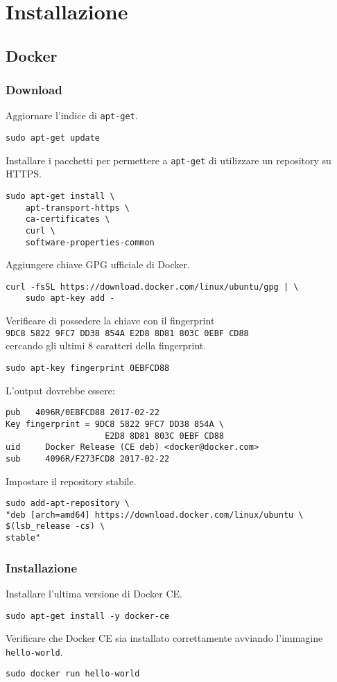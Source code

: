 \chapter{Installazione}
\label{Installazione}
\thispagestyle{empty}

\lstset{style=my-bash}

\section{Docker}

\subsection{Download}
Aggiornare l'indice di \verb|apt-get|.
\begin{lstlisting}
sudo apt-get update
\end{lstlisting}
Installare i pacchetti per permettere a \verb|apt-get| di utilizzare un repository su HTTPS.
\begin{lstlisting}
sudo apt-get install \ 
    apt-transport-https \
    ca-certificates \
    curl \
    software-properties-common
\end{lstlisting}
Aggiungere chiave GPG ufficiale di Docker.
\begin{lstlisting}
curl -fsSL https://download.docker.com/linux/ubuntu/gpg | \
    sudo apt-key add -
\end{lstlisting}
Verificare di possedere la chiave con il fingerprint\\
\verb|9DC8 5822 9FC7 DD38 854A E2D8 8D81 803C 0EBF CD88|\\
cercando gli ultimi 8 caratteri della fingerprint.
\begin{lstlisting}
sudo apt-key fingerprint 0EBFCD88
\end{lstlisting}
L'output dovrebbe essere:
\begin{lstlisting}
pub   4096R/0EBFCD88 2017-02-22
Key fingerprint = 9DC8 5822 9FC7 DD38 854A \
                    E2D8 8D81 803C 0EBF CD88
uid     Docker Release (CE deb) <docker@docker.com>
sub     4096R/F273FCD8 2017-02-22
\end{lstlisting}
Impostare il repository stabile.
\begin{lstlisting}
sudo add-apt-repository \
"deb [arch=amd64] https://download.docker.com/linux/ubuntu \
$(lsb_release -cs) \
stable"
\end{lstlisting}

\subsection{Installazione}
Installare l'ultima versione di Docker CE.
\begin{lstlisting}
sudo apt-get install -y docker-ce
\end{lstlisting}
Verificare che Docker CE sia installato correttamente avviando l'immagine \verb|hello-world|.
\begin{lstlisting}
sudo docker run hello-world
\end{lstlisting}


